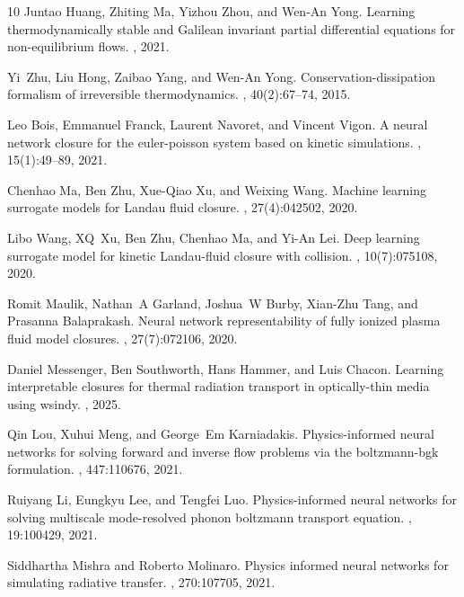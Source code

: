 \documentclass[11pt]{article}
\numberwithin{equation}{section}
\begin{document}
\begin{thebibliography}{10}
Juntao Huang, Zhiting Ma, Yizhou Zhou, and Wen-An Yong.
\newblock Learning thermodynamically stable and {G}alilean invariant partial
  differential equations for non-equilibrium flows.
, 2021.

Yi~Zhu, Liu Hong, Zaibao Yang, and Wen-An Yong.
\newblock Conservation-dissipation formalism of irreversible thermodynamics.
, 40(2):67--74, 2015.

Leo Bois, Emmanuel Franck, Laurent Navoret, and Vincent Vigon.
\newblock A neural network closure for the euler-poisson system based on
  kinetic simulations.
, 15(1):49--89, 2021.

Chenhao Ma, Ben Zhu, Xue-Qiao Xu, and Weixing Wang.
\newblock Machine learning surrogate models for {L}andau fluid closure.
, 27(4):042502, 2020.

Libo Wang, XQ~Xu, Ben Zhu, Chenhao Ma, and Yi-An Lei.
\newblock Deep learning surrogate model for kinetic {L}andau-fluid closure with
  collision.
, 10(7):075108, 2020.

Romit Maulik, Nathan~A Garland, Joshua~W Burby, Xian-Zhu Tang, and Prasanna
  Balaprakash.
\newblock Neural network representability of fully ionized plasma fluid model
  closures.
, 27(7):072106, 2020.

Daniel Messenger, Ben Southworth, Hans Hammer, and Luis Chacon.
\newblock Learning interpretable closures for thermal radiation transport in
  optically-thin media using wsindy.
, 2025.

Qin Lou, Xuhui Meng, and George~Em Karniadakis.
\newblock Physics-informed neural networks for solving forward and inverse flow
  problems via the boltzmann-bgk formulation.
, 447:110676, 2021.

Ruiyang Li, Eungkyu Lee, and Tengfei Luo.
\newblock Physics-informed neural networks for solving multiscale mode-resolved
  phonon boltzmann transport equation.
, 19:100429, 2021.

Siddhartha Mishra and Roberto Molinaro.
\newblock Physics informed neural networks for simulating radiative transfer.
,
  270:107705, 2021.


\end{thebibliography}
\end{document}
